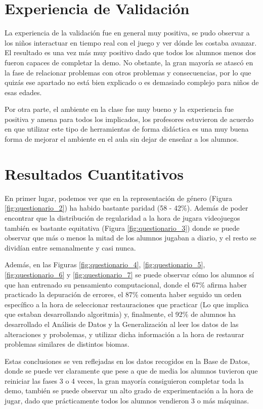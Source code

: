 \section{Experiencia de Validación}

La experiencia de la validación fue en general muy positiva, se pudo observar a los niños interactuar en tiempo real con el juego y ver dónde les costaba avanzar. El resultado es una vez más muy positivo dado que todos los alumnos menos dos fueron capaces de completar la demo. No obstante, la gran mayoría se atascó en la fase de relacionar problemas con otros problemas y consecuencias, por lo que quizás ese apartado no está bien explicado o es demasiado complejo para niños de esas edades.

Por otra parte, el ambiente en la clase fue muy bueno y la experiencia fue positiva y amena para todos los implicados, los profesores estuvieron de acuerdo en que utilizar este tipo de herramientas de forma didáctica es una muy buena forma de mejorar el ambiente en el aula sin dejar de enseñar a los alumnos.

\section{Resultados Cuantitativos}

En primer lugar, podemos ver que en la representación de género (Figura \ref{fig:questionario_2}) ha habido bastante paridad (58 - 42\%). Además de poder encontrar que la distribución de regularidad a la hora de jugara videojuegos también es bastante equitativa (Figura \ref{fig:questionario_3}) donde se puede observar que más o menos la mitad de los alumnos jugaban a diario, y el resto se dividían entre semanalmente y casi nunca.

Además, en las Figuras \ref{fig:questionario_4}, \ref{fig:questionario_5}, \ref{fig:questionario_6} y \ref{fig:questionario_7} se puede observar cómo los alumnos sí que han entrenado su pensamiento computacional, donde el 67\% afirma haber practicado la depuración de errores, el 87\% comenta haber seguido un orden específico a la hora de seleccionar restauraciones que practicar (Lo que implica que estaban desarrollando algoritmia) y, finalmente, el 92\% de alumnos ha desarrollado el Análisis de Datos y la Generalización al leer los datos de las alteraciones y probolemas, y utilizar dicha información a la hora de restaurar problemas similares de distintos biomas.

Estas conclusiones se ven reflejadas en los datos recogidos en la Base de Datos, donde se puede ver claramente que pese a que de media los alumnos tuvieron que reiniciar las fases 3 o 4 veces, la gran mayoría consiguieron completar toda la demo, también se puede observar un alto grado de experimentación a la hora de jugar, dado que prácticamente todos los alumnos vendieron 3 o más máquinas. 

